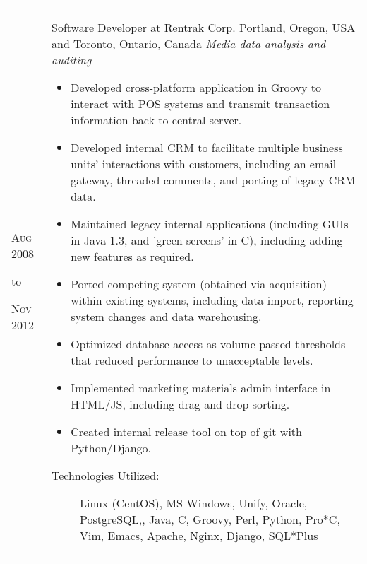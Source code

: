 \documentclass[a4paper,10pt]{article}
\begin{document}
        \\\begin{tabular}{ R{1.5cm} | p{10.5cm} }
            \hfill \textsc{Aug 2008}\newline \begin{center} to \end{center} \hfill \textsc{Nov 2012} &
            Software Developer at \href{https://en.wikipedia.org/wiki/Rentrak}{Rentrak Corp.}\newline
            Portland, Oregon, USA and Toronto, Ontario, Canada\newline
            \emph{Media data analysis and auditing} \newline
            \fontsize{9pt}{10pt}\selectfont
            \begin{itemize}
                \item Developed cross-platform application in Groovy to interact with POS systems and transmit transaction information back to central server.
                \item Developed internal CRM to facilitate multiple business units' interactions with customers, including an email gateway, threaded comments, and porting of legacy CRM data.
                \item Maintained legacy internal applications (including GUIs in Java 1.3, and 'green screens' in C), including adding new features as required.
                \item Ported competing system (obtained via acquisition) within existing systems, including data import, reporting system changes and data warehousing.
                \item Optimized database access as volume passed thresholds that reduced performance to unacceptable levels.
                \item Implemented marketing materials admin interface in HTML/JS, including drag-and-drop sorting.
                \item Created internal release tool on top of git with Python/Django.
            \end{itemize}
            \bigskip
            \begin{description}
                \item[Technologies Utilized:]
                Linux (CentOS), MS Windows, Unify, Oracle, PostgreSQL,, Java, C, Groovy, Perl, Python, Pro*C, Vim, Emacs, Apache, Nginx, Django, SQL*Plus
            \end{description}
        \end{tabular}
        \\
\end{document}
